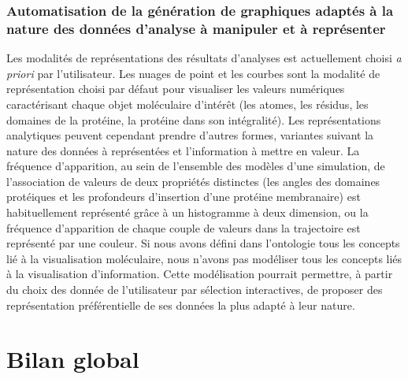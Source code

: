 {\subsubsection*{Automatisation de la génération de graphiques adaptés à la nature des données d'analyse à manipuler et à représenter}

Les modalités de représentations des résultats d'analyses est actuellement choisi \textit{a priori} par l'utilisateur. Les nuages de point et les courbes sont la modalité de représentation choisi par défaut pour visualiser les valeurs numériques caractérisant chaque objet moléculaire d'intérêt (les atomes, les résidus, les domaines de la protéine, la protéine dans son intégralité). Les représentations analytiques peuvent cependant prendre d'autres formes, variantes suivant la nature des données à représentées et l'information à mettre en valeur.  La fréquence d'apparition, au sein de l'ensemble des modèles d'une simulation, de l'association de valeurs de deux propriétés distinctes (les angles des domaines protéiques et les profondeurs d'insertion d'une protéine membranaire) est habituellement représenté grâce à un histogramme à deux dimension, ou la fréquence d'apparition de chaque couple de valeurs dans la trajectoire est représenté par une couleur. Si nous avons défini dans l'ontologie tous les concepts lié à la visualisation moléculaire, nous n'avons pas modéliser tous les concepts liés à la visualisation d'information. Cette modélisation pourrait permettre, à partir du choix des donnée de l'utilisateur par sélection interactives, de proposer des représentation préférentielle de ses données la plus adapté à leur nature.


\section*{Bilan global}

}
